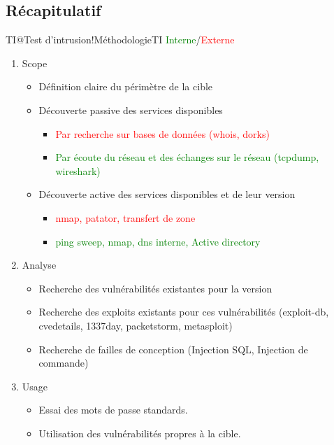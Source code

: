 \documentclass[twoside,a4paper,12pt,titlepage]{book}
\begin{document}
\begin{landscape}
	\footnotesize
	\section{Récapitulatif}
	\begin{Recap}{TI@Test d'intrusion!Méthodologie}{TI \textcolor{Green}{Interne}/\textcolor{red}{Externe}}
		\begin{enumerate}
			\item Scope 
			\begin{itemize}
				\item Définition claire du périmètre de la cible
				\item Découverte passive des services disponibles \begin{itemize}
					\item \textcolor{red}{Par recherche sur bases de données (whois, dorks)}
					\item \textcolor{Green}{Par écoute du réseau et des échanges sur le réseau (tcpdump, wireshark)}
				\end{itemize}
				\item Découverte active des services disponibles et de leur version \begin{itemize}
					\item \textcolor{red}{nmap, patator, transfert de zone}
					\item \textcolor{Green}{ping sweep, nmap, dns interne, Active directory}
				\end{itemize}
			\end{itemize}
			\item Analyse
			\begin{itemize}
				\item Recherche des vulnérabilités existantes pour la version
				\item Recherche des exploits existants pour ces vulnérabilités (exploit-db, cvedetails, 1337day, packetstorm, metasploit)
				\item Recherche de failles de conception (Injection SQL, Injection de commande)
			\end{itemize}
			\item Usage
			\begin{itemize}
				\item Essai des mots de passe standards.
				\item Utilisation des vulnérabilités propres à la cible.

\end{itemize}
\end{enumerate}
\end{Recap}
\end{landscape}
\end{document}
